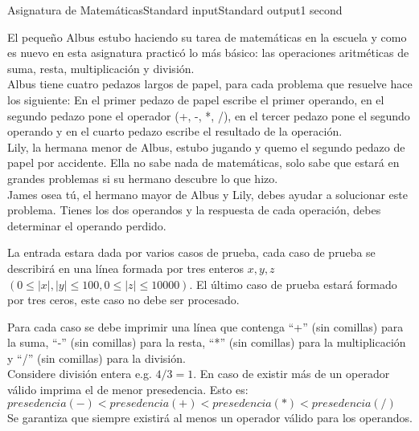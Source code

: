 \providecommand{\abs}[1]{\lvert#1\rvert}
\begin{problem}{Asignatura de Matemáticas}{Standard input}{Standard output}{1 second}


El pequeño Albus estubo haciendo su tarea de matemáticas en la escuela y como es nuevo en esta asignatura practicó lo más básico: las operaciones aritméticas de suma, resta, multiplicación y división.\\
Albus tiene cuatro pedazos largos de papel, para cada problema que resuelve hace los siguiente: En el primer pedazo de papel escribe el primer operando, en el segundo pedazo pone el operador (+, -, *, /), en el tercer pedazo pone el segundo operando y en el cuarto pedazo escribe el resultado de la operación.\\
Lily, la hermana menor de Albus, estubo jugando y quemo el segundo pedazo de papel por accidente. Ella no sabe nada de matemáticas, solo sabe que estará en grandes problemas si su hermano descubre lo que hizo.\\
James osea tú, el hermano mayor de Albus y Lily, debes ayudar a solucionar este problema. Tienes los dos operandos y la respuesta de cada operación, debes determinar el operando perdido.

\InputFile
La entrada estara dada por varios casos de prueba, cada caso de prueba se describirá en una línea formada por tres enteros $x, y, z$ $(0\leq \abs{x}, \abs{y} \leq 100, 0\leq \abs{z} \leq 10000)$. El último caso de prueba estará formado por tres ceros, este caso no debe ser procesado.

\OutputFile
Para cada caso se debe imprimir una línea que contenga ``+'' (sin comillas) para la suma, ``-'' (sin comillas) para la resta, ``*'' (sin comillas) para la multiplicación y ``/'' (sin comillas) para la división.\\
Considere división entera e.g. $ 4 / 3 = 1 $. En caso de existir más de un operador válido imprima el de menor presedencia. Esto es: $ presedencia(-) < presedencia(+) < presedencia(*) < presedencia(/)$\\
Se garantiza que siempre existirá al menos un operador válido para los operandos.

\Example

\begin{example}
\end{example}

\end{problem}
